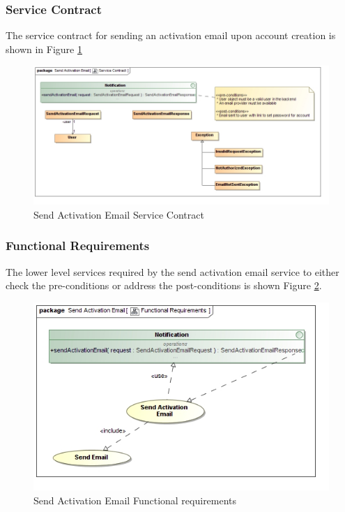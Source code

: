 \subsubsection{Service Contract}
The service contract for sending an activation email upon account creation is 
shown in Figure \ref{fig:sendActivationEmailServiceContract}

\begin{figure}[H]
	\begin{center}
		\includegraphics[scale=0.38]{../Diagrams and Charts/Notifications/Send Activation Email Service Contract.jpg}
		\caption{Send Activation Email Service Contract}
		\label{fig:sendActivationEmailServiceContract}
	\end{center}	
\end{figure}

\subsubsection{Functional Requirements}
The lower level services required by the send activation email service to either
check the pre-conditions or address the post-conditions is shown 
Figure \ref{fig:sendActivationEmailFunctionalRequirements}.
\begin{figure}[H]
	\begin{center}
		\includegraphics[scale=0.38]{../Diagrams and Charts/Notifications/Send Activation Email Functional Requirements.jpg}
		\caption{Send Activation Email Functional requirements}
		\label{fig:sendActivationEmailFunctionalRequirements}
	\end{center}	
\end{figure}



